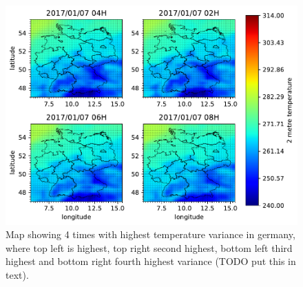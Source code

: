 \begin{figure}[h!]%
\centering
\includegraphics[width=\textwidth]{plots/t2m/bundles/maxvar4_maps}%
\caption{Map showing 4 times with highest temperature variance in germany, where top left is highest, top right second highest, bottom left third highest and bottom right fourth highest variance (TODO put this in text).}%
\label{fig:maxvar4_maps}%
\end{figure}



